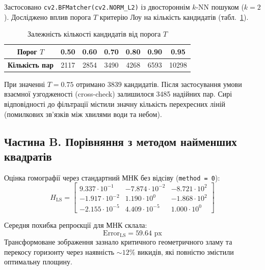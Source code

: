 \documentclass[14pt, a4paper]{article}
\begin{document}
Застосовано \texttt{cv2.BFMatcher(cv2.NORM\_L2)} із двостороннім $k$-NN пошуком ($k=2$). Досліджено вплив порога $T$ критерію Лоу на кількість кандидатів (табл.~\ref{tab:lowe}).

\begin{table}[h!]
\centering
\caption{Залежність кількості кандидатів від порога $T$}
\label{tab:lowe}
\begin{tabular}{ccccccc}
\toprule
\textbf{Порог $T$} & 0.50 & 0.60 & 0.70 & 0.80 & 0.90 & 0.95 \\
\midrule
\textbf{Кількість пар} & 2117 & 2854 & 3490 & 4268 & 6593 & 10298 \\
\bottomrule
\end{tabular}
\end{table}

При значенні $T=0.75$ отримано 3839 кандидатів. Після застосування умови взаємної узгодженості (cross-check) залишилося 3485 надійних пар. Сирі відповідності до фільтрації містили значну кількість перехресних ліній (помилкових зв'язків між хвилями води та небом).

\begin{figure}[h!]
\centering
{}
\end{figure}

\subsection{Частина B. Порівняння з методом найменших квадратів}
Оцінка гомографії через стандартний МНК без відсіву (\texttt{method = 0}):
\begin{equation*}
H_{\text{LS}} = \begin{bmatrix}
9.337 \cdot 10^{-1} & -7.874 \cdot 10^{-2} & -8.721 \cdot 10^{2} \\
-1.917 \cdot 10^{-2} & 1.190 \cdot 10^{0} & -1.868 \cdot 10^{2} \\
-2.155 \cdot 10^{-5} & 4.409 \cdot 10^{-5} & 1.000 \cdot 10^{0}
\end{bmatrix}
\end{equation*}

Середня похибка репроєкції для МНК склала:
\begin{equation*}
\text{Error}_{\text{LS}} = 59.64 \text{ px}
\end{equation*}
Трансформоване зображення зазнало критичного геометричного зламу та перекосу горизонту через наявність $\sim 12\%$ викидів, які повністю змістили оптимальну площину.
\end{document}
